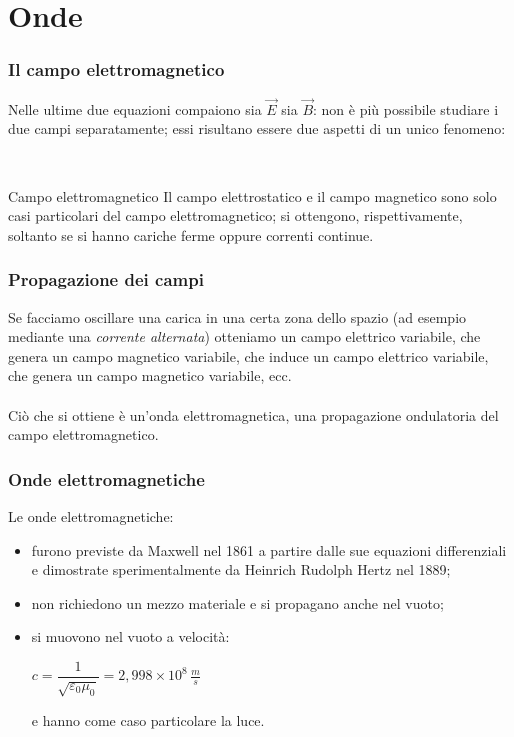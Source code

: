 \documentclass[]{beamer}
\theoremstyle{plain}
\begin{document}
\section{Onde}

\begin{frame}
  \frametitle{Il campo elettromagnetico}
Nelle ultime due equazioni \alert<1>{compaiono sia $ \vec{E} $ sia $ \vec{B} $}:{\pause} non è più possibile studiare i due campi separatamente; essi risultano essere \alert<2>{due aspetti di un unico fenomeno}:\pause

~

\begin{block}{Campo elettromagnetico}
Il campo elettrostatico e il campo magnetico sono solo casi particolari del campo elettromagnetico; si ottengono, rispettivamente, soltanto se si hanno cariche ferme oppure correnti continue.
\end{block}
\end{frame}






\begin{frame}
  \frametitle{Propagazione dei campi}
  Se facciamo oscillare una carica in una certa zona dello spazio (ad esempio mediante una \emph{corrente alternata}) otteniamo un \alert<1>{campo elettrico variabile},{\pause} che genera un \alert<2>{campo magnetico variabile},{\pause} che induce un \alert<3>{campo elettrico variabile},{\pause} che genera un \alert<4>{campo magnetico variabile}, ecc.\\\pause~\\Ciò che si ottiene è un'\alert<5>{onda elettromagnetica}, una propagazione ondulatoria del campo elettromagnetico.
\end{frame}



\begin{frame}
  \frametitle{Onde elettromagnetiche}
  Le onde elettromagnetiche:
  \begin{itemize}
    \item furono previste da Maxwell nel 1861 a partire dalle sue equazioni differenziali e dimostrate sperimentalmente da Heinrich Rudolph Hertz nel 1889;\pause
    \item non richiedono un mezzo materiale e si propagano anche nel vuoto;\pause
    \item si muovono nel vuoto a velocità:
    \begin{center}
    $ c = \dfrac{1}{\sqrt{\varepsilon_0 \mu_0}} = 2,998 \times 10^8 \, \frac{m}{s} $
    \end{center}
    e hanno come caso particolare la luce.
  \end{itemize}
\end{frame}
\end{document}
